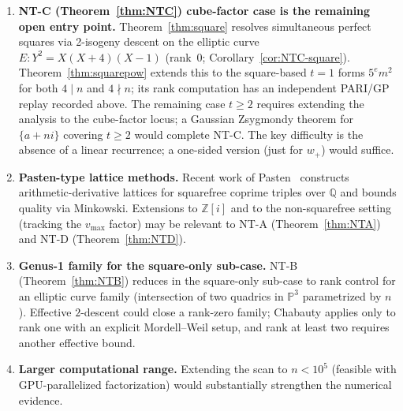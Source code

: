 \documentclass[12pt]{amsart}
\theoremstyle{plain}
\theoremstyle{definition}
\theoremstyle{remark}
\newcommand{\QQ}{\mathbb{Q}}
\newcommand{\Zi}{\mathbb{Z}[i]}
\begin{document}
\begin{enumerate}
\item \textbf{NT-C (Theorem~\ref{thm:NTC}) cube-factor case is the remaining open entry point.}
  Theorem~\ref{thm:square} resolves simultaneous perfect squares via 2-isogeny
  descent on the elliptic curve $E: Y^2=X(X+4)(X-1)$ (rank~0;
  Corollary~\ref{cor:NTC-square}).  Theorem~\ref{thm:squarepow} extends this
  to the square-based $t=1$ forms $5^e m^2$ for both $4\mid n$ and
  $4\nmid n$; its rank computation has an independent PARI/GP replay recorded
  above.
  The remaining case $t\geq 2$ requires extending the analysis to the
  cube-factor locus; a Gaussian Zsygmondy theorem for $\{a+ni\}$ covering
  $t\geq 2$ would complete NT-C.  The key difficulty is the absence of a
  linear recurrence; a one-sided version (just for $w_{+}$) would suffice.

\item \textbf{Pasten-type lattice methods.}
  Recent work of Pasten~\cite{Pasten2024} constructs arithmetic-derivative
  lattices for squarefree coprime triples over $\QQ$ and bounds quality
  via Minkowski.  Extensions to $\Zi$ and to the non-squarefree setting
  (tracking the $v_{\max}$ factor) may be relevant to
  NT-A (Theorem~\ref{thm:NTA}) and NT-D (Theorem~\ref{thm:NTD}).

\item \textbf{Genus-1 family for the square-only sub-case.}
  NT-B (Theorem~\ref{thm:NTB}) reduces in the square-only sub-case to rank
  control for an elliptic curve family (intersection of two quadrics in
  $\mathbb{P}^3$ parametrized by $n$).  Effective $2$-descent could close a
  rank-zero family; Chabauty applies only to rank one with an explicit
  Mordell--Weil setup, and rank at least two requires another effective bound.

\item \textbf{Larger computational range.}
  Extending the scan to $n<10^5$ (feasible with GPU-parallelized
  factorization) would substantially strengthen the numerical evidence.
\end{enumerate}
\end{document}
